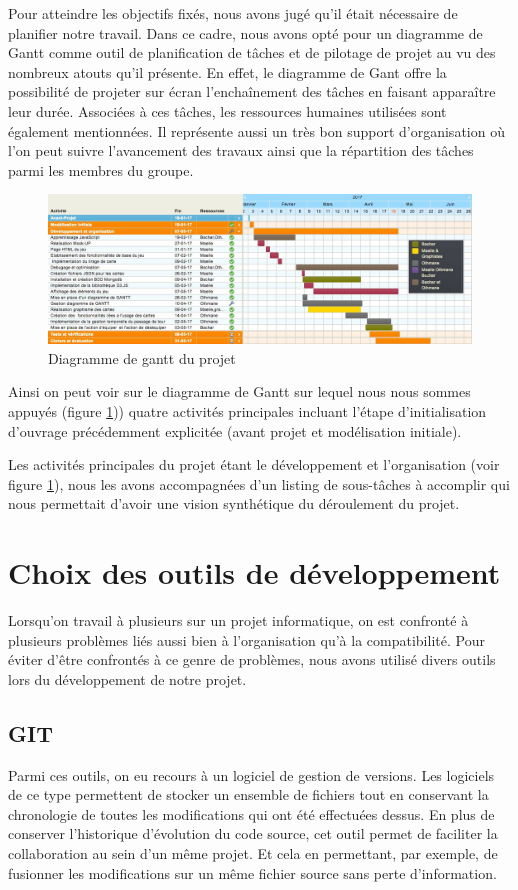 \documentclass[12pt]{report}
\begin{document}
		Pour atteindre les objectifs fixés,  nous avons jugé qu'il était nécessaire de planifier notre travail. Dans ce cadre,  nous avons opté pour un diagramme de Gantt comme outil de planification de tâches et de pilotage de projet au vu  des nombreux atouts qu’il présente. En effet, le diagramme de Gant offre la possibilité de projeter sur écran l’enchaînement des tâches en faisant apparaître leur durée. Associées à ces tâches, les ressources humaines utilisées sont  également mentionnées. Il représente aussi un très bon support d’organisation où l'on peut suivre l’avancement des travaux ainsi que la répartition des tâches parmi les membres du groupe.
		\begin{figure}[h!]
    	\centering
	    \includegraphics[scale=0.3]{diagrammeGantt.jpeg}
	    \caption{Diagramme de gantt du projet}
	    \label{fig:diagGantt}
    \end{figure}

\newpage
		Ainsi  on peut voir sur le diagramme de Gantt sur lequel nous nous sommes appuyés (figure \ref{fig:diagGantt})) quatre activités principales incluant l’étape d’initialisation d’ouvrage précédemment explicitée (avant projet et modélisation initiale).

		Les activités principales du projet étant le développement et l'organisation (voir figure \ref{fig:diagGantt}), nous les avons accompagnées d’un listing de sous-tâches à accomplir qui nous permettait d’avoir une vision synthétique du déroulement du projet.

\newpage


\section{Choix des outils de développement}
	Lorsqu’on travail à plusieurs sur un projet informatique, on est confronté à plusieurs problèmes liés aussi bien  à l’organisation qu’à la compatibilité.
	Pour éviter d'être confrontés à ce genre de problèmes, nous avons  utilisé divers outils lors du développement de notre  projet.
	\subsection*{GIT}
	 Parmi ces outils, on eu recours à un logiciel de gestion de versions. Les logiciels de ce type  permettent  de stocker un ensemble de fichiers  tout en conservant la chronologie de toutes les modifications qui ont été effectuées dessus.
	 En plus de conserver l’historique d’évolution du code source, cet outil permet de faciliter la collaboration au sein d’un même projet. Et cela en permettant, par exemple, de fusionner les modifications sur un même fichier source sans perte d’information.
\end{document}
